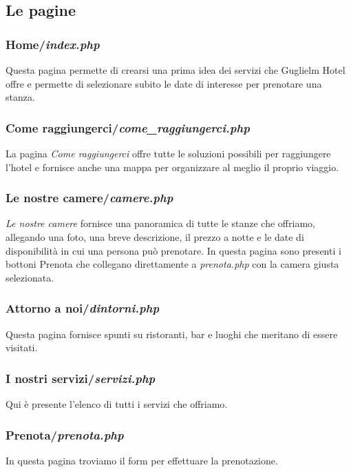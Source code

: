 \subsection{Le pagine}
\subsubsection{Home/\textit{index.php}}
Questa pagina permette di crearsi una prima idea dei servizi che Guglielm Hotel offre e permette di selezionare subito le date di interesse per prenotare una stanza.
\subsubsection{Come raggiungerci/\textit{come\_raggiungerci.php}}
La pagina \textit{Come raggiungerci} offre tutte le soluzioni possibili per raggiungere l'hotel e fornisce anche una mappa per organizzare al meglio il proprio viaggio.
\subsubsection{Le nostre camere/\textit{camere.php}}
\textit{Le nostre camere} fornisce una panoramica di tutte le stanze che offriamo, allegando una foto, una breve descrizione, il prezzo a notte e le date di disponibilità in cui una persona può prenotare.
In questa pagina sono presenti i bottoni Prenota che collegano direttamente a \textit{prenota.php} con la camera giusta selezionata.\\
\subsubsection{Attorno a noi/\textit{dintorni.php}}
Questa pagina fornisce spunti su ristoranti, bar e luoghi che meritano di essere visitati.
\subsubsection{I nostri servizi/\textit{servizi.php}}
Qui è presente l'elenco di tutti i servizi che offriamo.
\subsubsection{Prenota/\textit{prenota.php}}
In questa pagina troviamo il form per effettuare la prenotazione.
